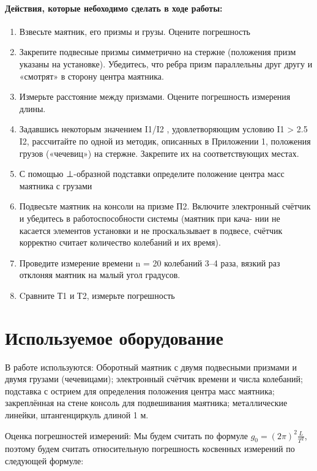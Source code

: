 \documentclass[a4paper, 10pt]{article}%
\begin{document}
\paragraph{Действия, которые небоходимо сделать в ходе работы:}
\begin{enumerate}
    \item Взвесьте маятник, его призмы и грузы. Оцените погрешность
    \item Закрепите подвесные призмы симметрично на стержне (положения
призм указаны на установке). Убедитесь, что ребра призм параллельны
друг другу и «смотрят» в сторону центра маятника.
\item Измерьте расстояние  между призмами. Оцените погрешность измерения длины.
\item Задавшись некоторым значением I1/I2 , удовлетворяющим условию
I1 > 2.5 I2, рассчитайте по одной из методик, описанных в Приложении 1,
положения грузов («чечевиц») на стержне. Закрепите их на соответствующих местах.
\item С помощью ⊥-образной подставки определите положение центра масс
маятника с грузами
\item Подвесьте маятник на консоли на призме П2. Включите электронный
счётчик и убедитесь в работоспособности системы (маятник при кача-
нии не касается элементов установки и не проскальзывает в подвесе,
счётчик корректно считает количество колебаний и их время).
\item Проведите измерение времени n = 20 колебаний 3–4 раза, вязкий раз
отклоняя маятник на малый угол   градусов. 
\item Cравните Т1 и Т2, измерьте погрешность




\end{enumerate}

\section{Используемое оборудование}
В работе используются: Оборотный маятник с двумя подвесными призмами и
двумя грузами (чечевицами); электронный счётчик времени и числа колебаний;
подставка с острием для определения положения центра масс маятника; закреплённая на стене консоль для подвешивания маятника; металлические линейки, штангенциркуль длиной 1 м.

Оценка погрешностей измерений:
Мы будем считать по формуле $g_0 = (2 \pi)^2 \frac{L}{T^2}$, поэтому будем считать относительную погрешность косвенных измерений по следующей формуле:
\end{document}
